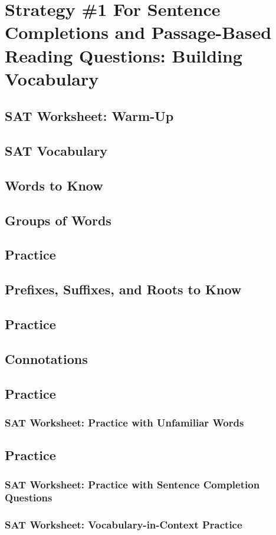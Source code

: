 \chapter{Strategy \#1 For Sentence Completions and Passage-Based Reading Questions: Building Vocabulary}

\section{SAT Worksheet: Warm-Up}
\section{SAT Vocabulary}
\section{Words to Know}
\section{Groups of Words}
\section{Practice}
\section{Prefixes, Suffixes, and Roots to Know}
\section{Practice}
\section{Connotations}
\section{Practice}
\subsection{SAT Worksheet: Practice with Unfamiliar Words}
\section{Practice}
\subsection{SAT Worksheet: Practice with Sentence Completion Questions}
\subsection{SAT Worksheet: Vocabulary-in-Context Practice}